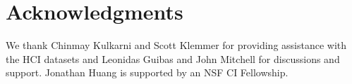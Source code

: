 
\section*{Acknowledgments}

{\footnotesize
We thank Chinmay Kulkarni and Scott Klemmer for providing assistance with the HCI datasets and Leonidas Guibas and John Mitchell
for discussions and support. Jonathan Huang is supported by an NSF 
CI Fellowship.
}